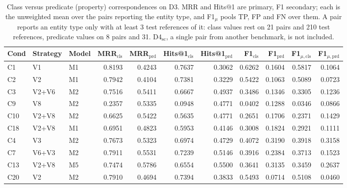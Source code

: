 \begin{table}[t]
\scriptsize
\setlength{\tabcolsep}{4pt}
\caption{Class versus predicate (property) correspondences on D3. MRR and Hits@1 are primary, F1 secondary; each is the unweighted mean over the pairs reporting the entity type, and F1$_{\mu}$ pools TP, FP and FN over them. A pair reports an entity type only with at least 3 test references of it: class values rest on 21 pairs and 210 test references, predicate values on 8 pairs and 31. D4$_{\mathrm{sc}}$, a single pair from another benchmark, is not included.}
\label{tab:entity_type}
\begin{tabular}{lllrrrrrrrr}
\hline
\textbf{Cond} & \textbf{Strategy} & \textbf{Model} & \textbf{MRR$_{\mathrm{cls}}$} & \textbf{MRR$_{\mathrm{prd}}$} & \textbf{Hits@1$_{\mathrm{cls}}$} & \textbf{Hits@1$_{\mathrm{prd}}$} & \textbf{F1$_{\mathrm{cls}}$} & \textbf{F1$_{\mathrm{prd}}$} & \textbf{F1$_{\mu,\mathrm{cls}}$} & \textbf{F1$_{\mu,\mathrm{prd}}$} \\
\hline
C1 & V1 & M1 & 0.8193 & 0.4243 & 0.7637 & 0.3062 & 0.6262 & 0.1604 & 0.5817 & 0.1064 \\
C2 & V2 & M1 & 0.7942 & 0.4104 & 0.7381 & 0.3229 & 0.5422 & 0.1063 & 0.5089 & 0.0723 \\
C3 & V2+V6 & M2 & 0.7516 & 0.5411 & 0.6667 & 0.4937 & 0.3486 & 0.1346 & 0.3305 & 0.1236 \\
C9 & V8 & M2 & 0.2357 & 0.5335 & 0.0948 & 0.4771 & 0.0402 & 0.1288 & 0.0346 & 0.0866 \\
C10 & V2+V8 & M2 & 0.6625 & 0.5422 & 0.5635 & 0.4771 & 0.2651 & 0.1706 & 0.2371 & 0.1429 \\
C18 & V2+V8 & M1 & 0.6951 & 0.4823 & 0.5953 & 0.4146 & 0.3008 & 0.1824 & 0.2921 & 0.1111 \\
C4 & V3 & M2 & 0.7673 & 0.5323 & 0.6974 & 0.4729 & 0.4072 & 0.3190 & 0.3918 & 0.3158 \\
C7 & V6+V3 & M2 & 0.7911 & 0.5531 & 0.7239 & 0.5146 & 0.3916 & 0.2384 & 0.3713 & 0.1523 \\
C13 & V2+V8 & M5 & 0.7474 & 0.5786 & 0.6554 & 0.5500 & 0.3641 & 0.3135 & 0.3459 & 0.2637 \\
C20 & V2 & M2 & 0.7910 & 0.4694 & 0.7394 & 0.3833 & 0.5493 & 0.0714 & 0.5108 & 0.0460 \\
\hline
\end{tabular}
\end{table}
